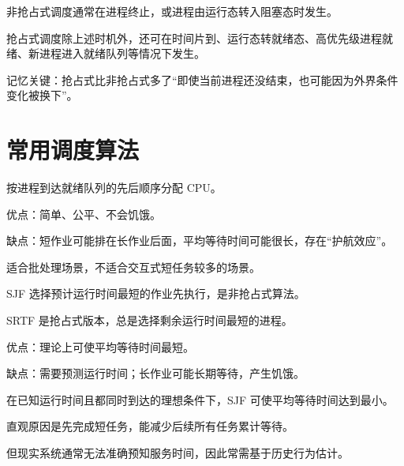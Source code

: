 \begin{points}
  \item 非抢占式调度通常在进程终止，或进程由运行态转入阻塞态时发生。
  \item 抢占式调度除上述时机外，还可在时间片到、运行态转就绪态、高优先级进程就绪、新进程进入就绪队列等情况下发生。
  \item 记忆关键：抢占式比非抢占式多了“即使当前进程还没结束，也可能因为外界条件变化被换下”。
\end{points}


\section{常用调度算法}
\begin{points}
  \item 按进程到达就绪队列的先后顺序分配 CPU。
  \item 优点：简单、公平、不会饥饿。
  \item 缺点：短作业可能排在长作业后面，平均等待时间可能很长，存在“护航效应”。
  \item 适合批处理场景，不适合交互式短任务较多的场景。
\end{points}


\begin{points}
  \item SJF 选择预计运行时间最短的作业先执行，是非抢占式算法。
  \item SRTF 是抢占式版本，总是选择剩余运行时间最短的进程。
  \item 优点：理论上可使平均等待时间最短。
  \item 缺点：需要预测运行时间；长作业可能长期等待，产生饥饿。
\end{points}


\begin{points}
  \item 在已知运行时间且都同时到达的理想条件下，SJF 可使平均等待时间达到最小。
  \item 直观原因是先完成短任务，能减少后续所有任务累计等待。
  \item 但现实系统通常无法准确预知服务时间，因此常需基于历史行为估计。
\end{points}


